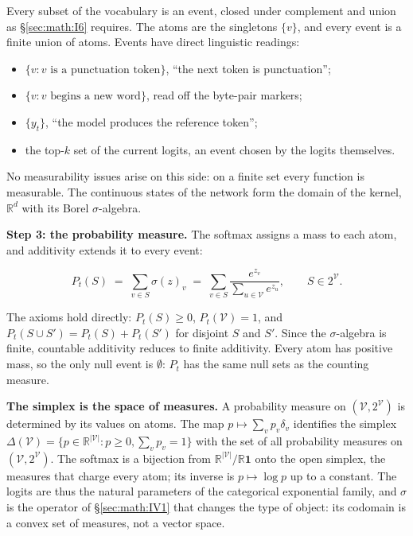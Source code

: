 Every subset of the vocabulary is an event, closed under complement and
union as \S\ref{sec:math:I6} requires. The atoms are the singletons \(\{v\}\), and every
event is a finite union of atoms. Events have direct linguistic
readings:

\begin{itemize}
\tightlist
\item
  \(\{v : v \text{ is a punctuation token}\}\), ``the next token is punctuation'';
\item
  \(\{v : v \text{ begins a new word}\}\), read off the byte-pair markers;
\item
  \(\{y_t\}\), ``the model produces the reference token'';
\item
  the top-\(k\) set of the current logits, an event chosen by the logits
  themselves.
\end{itemize}

No measurability issues arise on this side: on a finite set every
function is measurable. The continuous states of the network form the
domain of the kernel, \(\mathbb{R}^{d}\) with its Borel \(\sigma\)-algebra.

\textbf{Step 3: the probability measure.} The softmax assigns a mass to
each atom, and additivity extends it to every event:

\[
P_t(S) \;=\; \sum_{v\in S} \sigma(z)_v \;=\; \sum_{v\in S}\frac{e^{z_v}}{\sum_{u\in\mathcal V} e^{z_u}}, \qquad S\in 2^{\mathcal V}.
\]

The axioms hold directly: \(P_t(S) \ge 0\), \(P_t(\mathcal{V}) = 1\), and
\(P_t(S \cup S') = P_t(S) + P_t(S')\) for disjoint \(S\) and \(S'\). Since the
\(\sigma\)-algebra is finite, countable additivity reduces to finite additivity.
Every atom has positive mass, so the only null event is \(\emptyset\): \(P_t\) has the
same null sets as the counting measure.

\textbf{The simplex is the space of measures.} A probability measure on
\((\mathcal{V}, 2^{\mathcal{V}})\) is determined by its values on
atoms. The map \(p \mapsto \sum_v p_v \delta_v\) identifies the simplex
\(\Delta(\mathcal{V}) = \{p \in
\mathbb{R}^{|\mathcal{V}|} : p \ge 0, \sum_v p_v
= 1\}\) with the set of all probability measures on \((\mathcal{V},
2^{\mathcal{V}})\). The softmax is a bijection from
\(\mathbb{R}^{|\mathcal{V}|}/\mathbb{R}\mathbf{1}\)
onto the open simplex, the measures that charge every atom; its inverse
is \(p \mapsto \log p\) up to a constant. The logits are thus the natural
parameters of the categorical exponential family, and \(\sigma\) is the operator
of \S\ref{sec:math:IV1} that changes the type of object: its codomain is a convex set
of measures, not a vector space.

